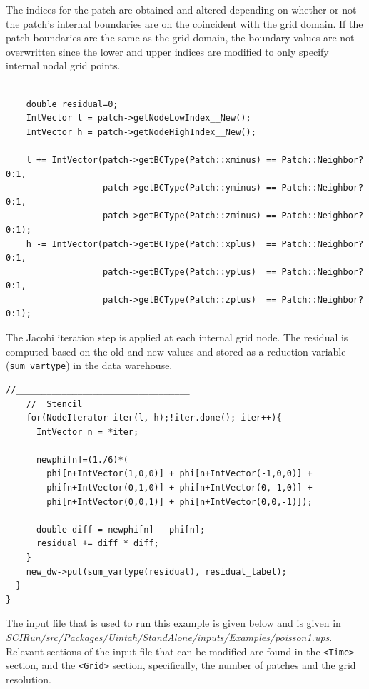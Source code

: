 \documentclass[12pt]{report}
\begin{document}
The indices for the patch are obtained and altered depending on
whether or not the patch's internal boundaries are on the coincident
with the grid domain.  If the patch boundaries are the same as the
grid domain, the boundary values are not overwritten since the lower
and upper indices are modified to only specify internal nodal grid
points.



\begin{Verbatim}[fontsize=\footnotesize]

    double residual=0;
    IntVector l = patch->getNodeLowIndex__New();
    IntVector h = patch->getNodeHighIndex__New();

    l += IntVector(patch->getBCType(Patch::xminus) == Patch::Neighbor?0:1,
                   patch->getBCType(Patch::yminus) == Patch::Neighbor?0:1,
                   patch->getBCType(Patch::zminus) == Patch::Neighbor?0:1);
    h -= IntVector(patch->getBCType(Patch::xplus)  == Patch::Neighbor?0:1,
                   patch->getBCType(Patch::yplus)  == Patch::Neighbor?0:1,
                   patch->getBCType(Patch::zplus)  == Patch::Neighbor?0:1);

\end{Verbatim}

The Jacobi iteration step is applied at each internal grid node.  The
residual is computed based on the old and new values and stored as a
reduction variable (\texttt{sum\_vartype}) in the data warehouse.

\begin{Verbatim}[fontsize=\footnotesize]
    //__________________________________
    //  Stencil
    for(NodeIterator iter(l, h);!iter.done(); iter++){
      IntVector n = *iter;

      newphi[n]=(1./6)*(
        phi[n+IntVector(1,0,0)] + phi[n+IntVector(-1,0,0)] +
        phi[n+IntVector(0,1,0)] + phi[n+IntVector(0,-1,0)] +
        phi[n+IntVector(0,0,1)] + phi[n+IntVector(0,0,-1)]);

      double diff = newphi[n] - phi[n];
      residual += diff * diff;
    }
    new_dw->put(sum_vartype(residual), residual_label);
  }
}

\end{Verbatim}

The input file that is used to run this example is given below and is
given in
\emph{SCIRun/src/Packages/Uintah/StandAlone/inputs/Examples/poisson1.ups}.
Relevant sections of the input file that can be modified are found in
the \texttt{<Time>} section, and the \texttt{<Grid>} section,
specifically, the number of patches and the grid resolution.
\end{document}
